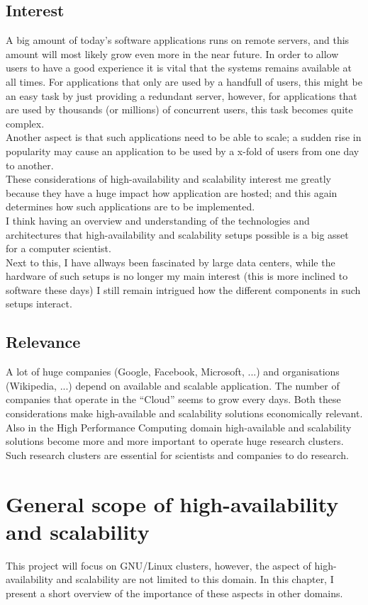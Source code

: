 \documentclass[12pt]{report}
\begin{document}
\section{Interest}
A big amount of today's software applications runs on remote servers, and
this amount will most likely grow even more in the near future. In
order to allow users to have a good experience it is vital that the
systems remains available at all times. For applications that only are
used by a handfull of users, this might be an easy task by just
providing a redundant server, however, for applications that are used
by thousands (or millions) of concurrent users, this task becomes
quite complex.\\
Another aspect is that such applications need to be able to scale; a
sudden rise in popularity may cause an application to be used by a
x-fold of users from one day to another.\\
These considerations of high-availability and scalability interest me
greatly because they have a huge impact how application are
hosted; and this again determines how such applications are to be
implemented.\\
 I think having an overview and understanding of the technologies and
architectures that high-availability and scalability setups possible
is a big asset for a computer scientist.\\
Next to this, I have allways been fascinated by large data centers,
while the hardware of such setups is no longer my main interest (this
is more inclined to software these days) I still remain intrigued how
the different components in such setups interact.

\section{Relevance}
A lot of huge companies (Google, Facebook, Microsoft, ...) and
organisations (Wikipedia, ...) depend on available and scalable
application. The number of companies that operate in the ``Cloud''
seems to grow every days. Both these considerations make
high-available and scalability solutions economically relevant.
Also in the High Performance Computing domain high-available and
scalability solutions become more and more important to operate huge
research clusters. Such research clusters are essential for scientists
and companies to do research.

\chapter{General scope of high-availability and scalability}
This project will focus on GNU/Linux clusters, however,
the aspect of high-availability and scalability are not limited to
this domain. In this chapter, I present a short overview of the
importance of these aspects in other domains.
\end{document}
